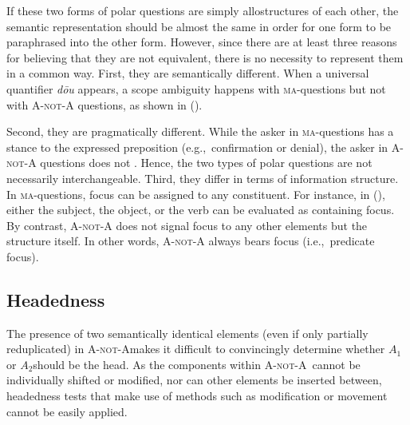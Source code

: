 \documentclass[11pt]{article}
\def\anota{\textsc{A-not-A}}
\def\aone{$A_1$}
\def\atwo{$A_2$}
\newcommand{\myref}[1]{(\getref{#1})}
\begin{document}
\noindent If these two forms of polar questions are simply
allostructures of each other, the semantic representation should be
almost the same in order for one form to be paraphrased into the other
form. However, since there are at least three reasons for believing
that they are not equivalent, there is no necessity to represent them
in a common way.  First, they are semantically different.  When a
universal quantifier \textit{d\={o}u} appears, a scope ambiguity
happens with \textsc{ma}-questions but not with {\anota} questions, as
shown in \myref{exe:scope}.


{\small 
{}}
\vspace{-20pt}

\noindent Second, they are pragmatically different. While the asker in
\textsc{ma}-questions has a stance to the expressed preposition
(e.g.,\ confirmation or denial), the asker in {\anota} questions does
not \cite{liing:14}. Hence, the two types of polar questions are not
necessarily interchangeable. Third, they differ in terms of information
structure. In \textsc{ma}-questions, focus can be assigned to any
constituent. For instance, in \myref{exe:yesno}, either the subject,
the object, or the verb can be evaluated as containing focus. By
contrast, {\anota} does not signal focus to any other elements but
the structure itself. In other words, {\anota} always bears focus
(i.e.,\ predicate focus).


\subsection{Headedness}
\label{ssec:head}

The presence of two semantically identical elements (even if only partially reduplicated) in \anota makes
it difficult to convincingly determine whether \aone or \atwo should be the head. As the components within \anota ~cannot be individually shifted or modified, nor can other elements be inserted between, headedness tests that make use of methods such as modification or movement cannot be easily applied.
\end{document}
